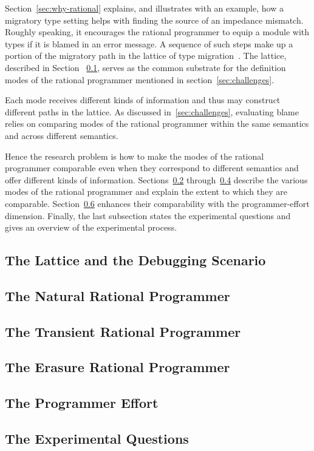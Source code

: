 
Section~\ref{sec:why-rational} explains, and illustrates with an example,
how a migratory type setting helps with finding the source of an impedance
mismatch. Roughly speaking, it encourages the rational programmer to
equip a module with types if it is blamed in an error message. A sequence
of such steps make up a portion of the migratory path in the lattice of
type migration~\cite{tfgnvf-popl-2016}. The lattice, described in Section
~\ref{sub:stuff},  serves as the common substrate for the definition modes
of the rational programmer mentioned in section~\ref{sec:challenges}. 

Each mode receives different kinds of information and thus may construct
different paths in the lattice. As discussed in~\ref{sec:challenges},
evaluating blame relies on comparing modes of the rational programmer
within the same semantics and across different semantics.  

Hence the research problem is how to make the modes of the rational programmer
comparable even when they correspond to different semantics and offer different kinds of information. Sections~\ref{sub:natural}
through~\ref{sub:erasure} describe the various modes of the rational programmer and explain
the extent to which they are comparable. Section~\ref{sub:experiment}
enhances their comparability with the programmer-effort dimension. Finally, the last
subsection states the experimental questions and gives an overview of the
experimental process. 

\def\rsub#1#2{\subsection{#2} \label{sub:#1} }

\rsub{stuff}     {The Lattice and the Debugging Scenario} 
\rsub{natural}   {The Natural Rational Programmer} 
\rsub{transient} {The Transient Rational Programmer} 
\rsub{erasure}   {The Erasure Rational Programmer} 
\rsub{effort}    {The Programmer Effort} \label{subsec:effort}
\rsub{experiment}{The Experimental Questions} 
